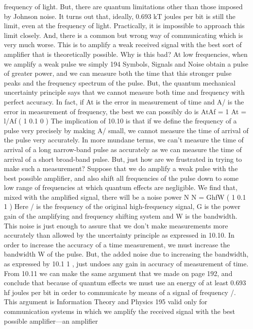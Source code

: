 {{{{{{{{{{{frequency of light. But, there are quantum limitations other than
those imposed by Johnson noise. It turns out that, ideally, 0.693
kT joules per bit is still the limit, even at the frequency of light.
Practically, it is impossible to approach this limit closely. And,
there is a common but wrong way of communicating which is very
much worse. This is to amplify a weak received signal with the best
sort of amplifier that is theoretically possible. Why is this bad?
At low frequencies, when we amplify a weak pulse we simply
194 Symbols, Signals and Noise
obtain a pulse of greater power, and we can measure both the time
that this stronger pulse peaks and the frequency spectrum of the
pulse. But, the quantum mechanical uncertainty principle says that
we cannot measure both time and frequency with perfect accuracy.
In fact, if At is the error in measurement of time and A/ is the
error in measurement of frequency, the best we can possibly do is
AtAf = 1
At = l/Af ( 1 0.1 0 )
The implication of 10.10 is that if we define the frequency of a
pulse very precisely by making A/ small, we cannot measure the
time of arrival of the pulse very accurately. In more mundane
terms, we can’t measure the time of arrival of a long narrow-band
pulse as accurately as we can measure the time of arrival of a short
broad-band pulse. But, just how are we frustrated in trying to make
such a measurement?
Suppose that we do amplify a weak pulse with the best possible
amplifier, and also shift all frequencies of the pulse down to some
low range of frequencies at which quantum effects are negligible.
We find that, mixed with the amplified signal, there will be a noise
power N
N = GhfW ( 1 0.1 1 )
Here / is the frequency of the original high-frequency signal, G is
the power gain of the amplifying and frequency shifting system and
W is the bandwidth. This noise is just enough to assure that we
don’t make measurements more accurately than allowed by the uncertainty
principle as expressed in 10.10.
In order to increase the accuracy of a time measurement, we
must increase the bandwidth W of the pulse. But, the added noise
due to increasing the bandwidth, as expressed by 10.1 1 , just undoes
any gain in accuracy of measurement of time.
From 10.11 we can make the same argument that we made on
page 192, and conclude that because of quantum effects we must
use an energy of at least 0.693 hf joules per bit in order to communicate
by means of a signal of frequency /. This argument is
Information Theory and Physics
195
valid only for communication systems in which we amplify the
received signal with the best possible amplifier—an amplifier
}}}}}}}}}}}
